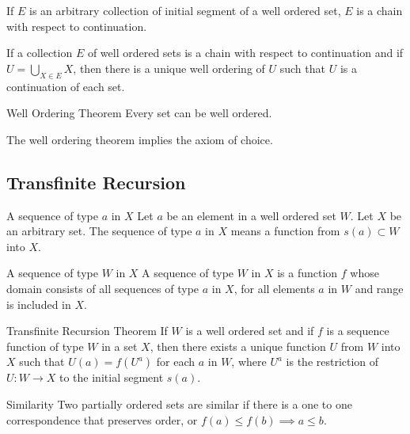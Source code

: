 \documentclass[a4paper]{article}
\begin{document}
\begin{thm}{}{} If $E$ is an arbitrary collection of initial segment of a well ordered set, $E$ is a chain with respect to continuation. 
\end{thm}

\begin{thm}{}{} If a collection $E$ of well ordered sets is a chain with respect to continuation and if $U=\bigcup_{X\in E}X$, then there is a unique well ordering of $U$ such that $U$ is a continuation of each set. 
\end{thm}

\begin{thm}{Well Ordering Theorem}{} Every set can be well ordered. 
\end{thm}

\begin{prp}{}{} The well ordering theorem implies the axiom of choice. 
\end{prp}

\subsection{Transfinite Recursion}
\begin{defn}{A sequence of type $a$ in $X$}{} Let $a$ be an element in a well ordered set $W$. Let $X$ be an arbitrary set. The sequence of type $a$ in $X$ means a function from $s(a)\subset W$ into $X$. 
\end{defn}

\begin{defn}{A sequence of type $W$ in $X$}{} A sequence of type $W$ in $X$ is a function $f$ whose domain consists of all sequences of type $a$ in $X$, for all elements $a$ in $W$ and range is included in $X$. 
\end{defn}

\begin{thm}{Transfinite Recursion Theorem}{} If $W$ is a well ordered set and if $f$ is a sequence function of type $W$ in a set $X$, then there exists a unique function $U$ from $W$ into $X$ such that $U(a)=f(U^a)$ for each $a$ in $W$, where $U^a$ is the restriction of $U:W\to X$ to the initial segment $s(a)$. 
\end{thm}

\begin{defn}{Similarity}{} Two partially ordered sets are similar if there is a one to one correspondence that preserves order, or $f(a)\leq f(b)\implies a\leq b$. 
\end{defn}
\end{document}
